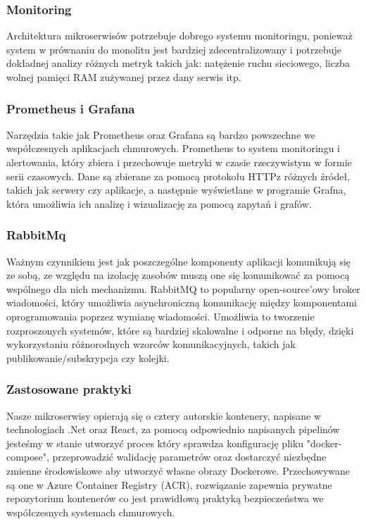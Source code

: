 \subsubsection{Monitoring}
Architektura mikroserwisów potrzebuje dobrego systemu monitoringu, ponieważ system w prównaniu do monolitu jest bardziej zdecentralizowany i potrzebuje dokładnej analizy różnych metryk takich jak: natężenie ruchu sieciowego, liczba wolnej pamięci RAM zużywanej przez dany serwis itp.

\subsubsection{Prometheus i Grafana}
Narzędzia takie jak Prometheus oraz Grafana są bardzo powszechne we współczesnych aplikacjach chmurowych. Prometheus to system monitoringu i alertowania, który zbiera i przechowuje metryki w czasie rzeczywistym w formie serii czasowych. Dane są zbierane za pomocą protokołu HTTP\linebreak z różnych źródeł, takich jak serwery czy aplikacje, a następnie wyświetlane w programie Grafna, która umożliwia ich analizę i wizualizację za pomocą zapytań i grafów.

\subsubsection{RabbitMq}
Ważnym czynnikiem jest jak poszczególne komponenty aplikacji komunikują się ze sobą, ze względu na izolację zasobów muszą one się komunikować za pomocą wspólnego dla nich mechanizmu. RabbitMQ to popularny open-source'owy broker wiadomości, który umożliwia asynchroniczną komunikację między komponentami oprogramowania poprzez wymianę wiadomości. Umożliwia to tworzenie rozproszonych systemów, które są bardziej skalowalne i odporne na błędy, dzięki wykorzystaniu różnorodnych wzorców komunikacyjnych, takich jak publikowanie/subskrypcja czy kolejki.

\subsubsection{Zastosowane praktyki}
Nasze mikroserwisy opierają się o cztery autorskie kontenery, napisane w technologiach .Net oraz React, za pomocą odpowiednio napisanych pipelinów jesteśmy w stanie utworzyć proces który sprawdza konfigurację pliku "docker-compose", przeprowadzić walidację parametrów oraz dostarczyć niezbędne zmienne środowiskowe aby utworzyć własne obrazy Dockerowe. Przechowywane są one w Azure Container Registry (ACR), rozwiązanie zapewnia prywatne repozytorium kontenerów co jest prawidłową praktyką bezpieczeństwa we współczesnych systemach chmurowych.

